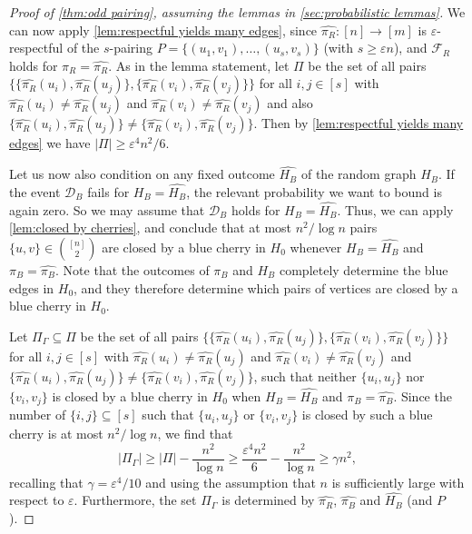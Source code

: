 \documentclass[11pt,reqno,oneside]{amsart}
\theoremstyle{definition}
\newcommand\wh[1]{\widehat{#1}}
\newcommand\1{\mathbf{1}}
\newcommand{\su}{\subseteq}
\newcommand{\eps}{\varepsilon}
\let\geq\geqslant
\begin{document}
\begin{proof}[Proof of \cref{thm:odd pairing}, assuming the lemmas in \cref{sec:probabilistic lemmas}]
    We can now apply \cref{lem:respectful yields many edges}, since $\wh{\pi_R}:[n]\to [m]$ is $\varepsilon$-respectful of the $s$-pairing $P=\{(u_1,v_1),\dots,(u_{s},v_{s})\}$ (with $s\geq \eps n$), and $\mathcal{F}_R$ holds for $\pi_R=\wh{\pi_R}$. As in the lemma statement, let  $\Pi$ be the set of all pairs $\big\{\{\wh{\pi_R}(u_i),\wh{\pi_R}(u_j)\}, \{\wh{\pi_R}(v_i),\wh{\pi_R}(v_j)\}\big\}$ for all $i,j\in [s]$ with $\wh{\pi_R}(u_i)\ne\wh{\pi_R}(u_j)$ and $\wh{\pi_R}(v_i)\ne\wh{\pi_R}(v_j)$ and also $\{\wh{\pi_R}(u_i),\wh{\pi_R}(u_j)\}\ne \{\wh{\pi_R}(v_i),\wh{\pi_R}(v_j)\}$. Then by \cref{lem:respectful yields many edges} we have $|\Pi|\geq \eps^4n^2/6$.

    Let us now also condition on any fixed outcome $\wh{H_B}$ of the random graph $H_B$. If the event $\mathcal D_B$ fails for $H_B=\wh{H_B}$, the relevant probability we want to bound is again zero. So we may assume that $\mathcal D_B$ holds for $H_B=\wh{H_B}$. Thus, we can apply \cref{lem:closed by cherries}, and conclude that at most $n^2/{\log n}$ pairs $\{u,v\} \in \binom{[n]}2$ are closed by a blue cherry in $H_0$ whenever $H_B=\wh{H_B}$ and $\pi_B=\wh{\pi_B}$. Note that the outcomes of $\pi_B$ and $H_B$ completely determine the blue edges in $H_0$, and they therefore determine which pairs of vertices are closed by a blue cherry in $H_0$.
    
    Let $\Pi_\Gamma\su \Pi$ be the set of all pairs $\big\{\{\wh{\pi_R}(u_i),\wh{\pi_R}(u_j)\}, \{\wh{\pi_R}(v_i),\wh{\pi_R}(v_j)\}\big\}$ for all $i,j\in [s]$ with $\wh{\pi_R}(u_i)\ne\wh{\pi_R}(u_j)$ and $\wh{\pi_R}(v_i)\ne\wh{\pi_R}(v_j)$ and $\{\wh{\pi_R}(u_i),\wh{\pi_R}(u_j)\}\ne \{\wh{\pi_R}(v_i),\wh{\pi_R}(v_j)\}$, such that neither $\{u_i,u_j\}$ nor $\{v_i,v_j\}$ is closed by a blue cherry in $H_0$ when $H_B=\wh{H_B}$ and $\pi_B=\wh{\pi_B}$. Since the number of $\{i,j\}\su [s]$ such that $\{u_i,u_j\}$ or $\{v_i,v_j\}$ is closed by such a blue cherry is at most $n^2/{\log n}$, we find that
    \[|\Pi_\Gamma|\geq |\Pi|-\frac{n^2}{\log n}\geq \frac{\eps^4n^2}{6}-\frac{n^2}{\log n}\geq \gamma n^2,\]
    recalling that $\gamma=\eps^4/10$ and using the assumption that $n$  is sufficiently large with respect to $\eps$. Furthermore, the set $\Pi_\Gamma$ is determined by $\wh{\pi_R}$, $\wh{\pi_B}$ and $\wh{H_B}$ (and $P$).


\end{proof}
\end{document}
